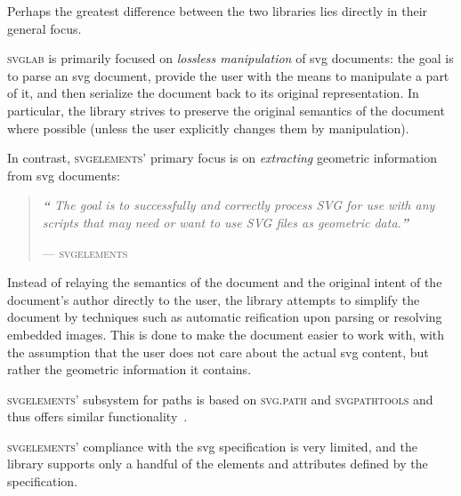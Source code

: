 Perhaps the greatest difference between the two libraries lies directly in their general focus.

\textsc{svglab} is primarily focused on \emph{lossless manipulation} of \gls{svg} documents: the goal is to parse an \gls{svg} document, provide the user with the means to manipulate a part of it, and then serialize the document back to its original representation. In particular, the library strives to preserve the original semantics of the document where possible (unless the user explicitly changes them by manipulation).

In contrast, \textsc{svgelements}' primary focus is on \emph{extracting} geometric information from \gls{svg} documents:
\begin{quote}
    \itshape
    \setlength{\rightmargin}{\leftmargin}
    {\Large\textbf{``}} The goal is to successfully and correctly process SVG for use with any scripts that may need or want to use SVG files as geometric data.{\Large\textbf{''}}
    \upshape
    \item[]\mbox{}\hfill--- \textsc{svgelements}~\cite{svgelements}
\end{quote}

Instead of relaying the semantics of the document and the original intent of the document's author directly to the user, the library attempts to simplify the document by techniques such as automatic reification upon parsing or resolving embedded images. This is done to make the document easier to work with, with the assumption that the user does not care about the actual \gls{svg} content, but rather the geometric information it contains.

\textsc{svgelements}' subsystem for paths is based on \textsc{svg.path} and \textsc{svgpathtools} and thus offers similar functionality~\cite{svgelements}.

\textsc{svgelements}' compliance with the \gls{svg} specification is very limited, and the library supports only a handful of the elements and attributes defined by the specification.
